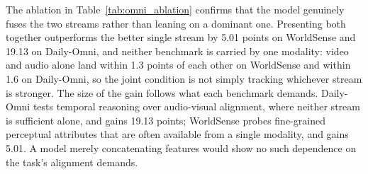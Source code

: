 The ablation in Table~\ref{tab:omni_ablation} confirms that the model genuinely fuses the two
streams rather than leaning on a dominant one. Presenting both together outperforms the better
single stream by 5.01 points on WorldSense and 19.13 on Daily-Omni, and neither benchmark is
carried by one modality: video and audio alone land within 1.3 points of each other on WorldSense
and within 1.6 on Daily-Omni, so the joint condition is not simply tracking whichever stream is
stronger. The size of the gain follows what each benchmark demands. Daily-Omni tests temporal
reasoning over audio-visual alignment, where neither stream is sufficient alone, and gains 19.13
points; WorldSense probes fine-grained perceptual attributes that are often available from a single
modality, and gains 5.01. A model merely concatenating features would show no such dependence on
the task's alignment demands.













